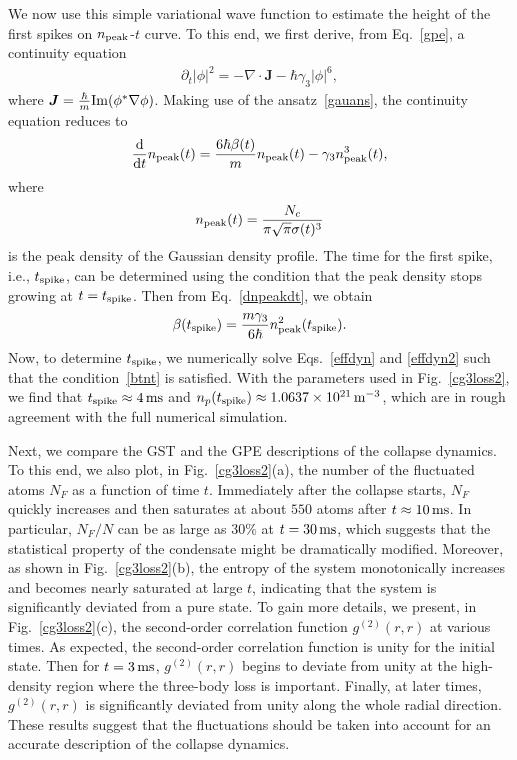\documentclass[pra,twocolumn,preprintnumbers,superscriptaddress,longbibliography,showkeys]{revtex4-1}
\begin{document}
We now use this simple variational wave function to estimate the height of the first spikes on $n_{\rm peak}$-$t$ curve. To this end, we first derive, from Eq.~\eqref{gpe}, a continuity equation
\begin{align}
\partial_t|\phi|^2=-\nabla\cdot{\bm J}-\hbar\gamma_3|\phi|^6,
\end{align}
where ${\bm J}=\frac{\hbar}{m}{\rm Im}(\phi^*\nabla\phi)$. Making use of the ansatz~\eqref{gauans}, the continuity equation reduces to
\begin{align}
\frac{{\rm d}}{{\rm d}t} n_{\rm peak}(t) = \frac{6\hbar\beta(t)}{m}  n_{\rm peak}(t) - \gamma_{3} n^{3}_{\rm peak}(t),\label{dnpeakdt}
\end{align}
where
\begin{align}
n_{\rm peak}(t) = \frac{N_{c}}{\pi \sqrt{\pi} \sigma(t)^{3}}\nonumber
\end{align}
is the peak density of the Gaussian density profile. The time for the first spike, i.e., $t_{\rm spike}$, can be determined using the condition that the peak density stops growing at $t=t_{\rm spike}$. Then from Eq.~\eqref{dnpeakdt}, we obtain
\begin{align}
\beta(t_{\rm spike}) = \frac{m \gamma_{3}}{6 \hbar} n^{2}_{\rm peak}(t_{\rm spike}).\label{btnt}
\end{align}
Now, to determine $t_{\rm spike}$, we numerically solve Eqs.~\eqref{effdyn} and \eqref{effdyn2} such that the condition~\eqref{btnt} is satisfied. With the parameters used in Fig.~\ref{cg3loss2}, we find that $t_{\rm spike}\approx 4\,{\rm ms}$ and $n_{p}(t_{\rm spike})\approx1.0637 \times 10^{21}\, {\rm m}^{-3}$, which are in rough agreement with the full numerical simulation.

Next, we compare the GST and the GPE descriptions of the collapse dynamics. To this end, we also plot, in Fig.~\ref{cg3loss2}(a), the number of the fluctuated atoms $N_F$ as a function of time $t$. Immediately after the collapse starts, $N_F$ quickly increases and then saturates at about $550$ atoms after $t\approx10\,{\rm ms}$. In particular, $N_F/N$ can be as large as $30\%$ at $t=30\,{\rm ms}$, which suggests that the statistical property of the condensate might be dramatically modified. Moreover, as shown in Fig.~\ref{cg3loss2}(b), the entropy of the system monotonically increases and becomes nearly saturated at large $t$,  indicating that the system is significantly deviated from a pure state. To gain more details, we present, in Fig.~\ref{cg3loss2}(c), the second-order correlation function $g^{(2)}(r,r)$ at various times. As expected, the second-order correlation function is unity for the initial state. Then for $t=3\,{\rm ms}$, $g^{(2)}(r,r)$ begins to deviate from unity at the high-density region where the three-body loss is important. Finally, at later times, $g^{(2)}(r,r)$ is significantly deviated from unity along the whole radial direction. These results suggest that the fluctuations should be taken into account for an accurate description of the collapse dynamics.
\end{document}
